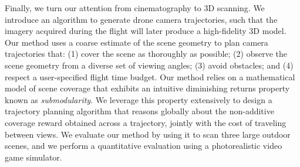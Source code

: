 Finally, we turn our attention from cinematography to 3D scanning.
We introduce an algorithm to generate drone camera trajectories, such that the imagery acquired during the flight will later produce a high-fidelity 3D model. Our method uses a coarse estimate of the scene geometry to plan camera trajectories that: (1) cover the scene as thoroughly as possible; (2) observe the scene geometry from a diverse set of viewing angles; (3) avoid obstacles; and (4) respect a user-specified flight time
budget. Our method relies on a mathematical model of scene coverage that exhibits an intuitive diminishing returns property known as \emph{submodularity}.
We leverage this property extensively to design a trajectory planning algorithm  that reasons globally about the non-additive coverage reward obtained across a trajectory, jointly with the cost of traveling between views.
We evaluate our method by using it to scan three large outdoor scenes, and we perform a quantitative evaluation using a photorealistic video game simulator.
